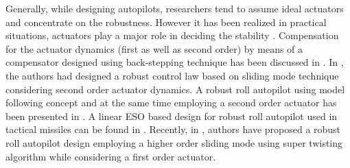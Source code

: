 \documentclass[conference]{IEEEtran}
\begin{document}

Generally, while designing autopilots, researchers tend to assume ideal actuators and concentrate on the robustness. However it has been realized in practical situations, actuators play a major role in deciding the stability \cite{nesline1984}. Compensation for the actuator dynamics (first as well as second order) by means of a compensator designed using back-stepping technique has been discussed in \cite{chwa2004}. In \cite{parkhi2010}, the authors had designed a robust control law based on sliding mode technique considering second order actuator dynamics. A robust roll autopilot using model following concept and at the same time employing a second order actuator has been presented in \cite{gezer2014}. A linear ESO based design for robust roll autopilot used in tactical missiles can be found in \cite{talole2011}. Recently, in \cite{sankar2016}, authors have proposed a robust roll autopilot design employing a higher order sliding mode using super twisting algorithm while considering a first order actuator.

\end{document}
